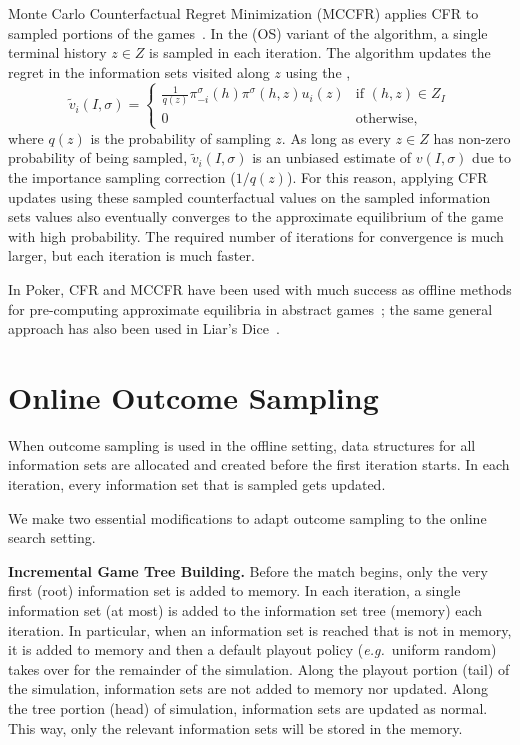 \documentclass{aamas2015}
\newcommand{\defword}[1]{\textbf{\boldmath{#1}}}
\newcommand{\eg}{{\it e.g.}~}
\begin{document}
Monte Carlo Counterfactual Regret Minimization (MCCFR) applies CFR to sampled portions of the games~\cite{Lanctot09Sampling}. 
In the \defword{outcome sampling} (OS) variant of the algorithm, a single terminal history $z\in Z$ is sampled in each iteration. 
The algorithm updates the regret in the information sets visited along $z$ using the 
\defword{sampled counterfactual value}, 
\begin{equation*}
\tilde{v}_i(I,\sigma) = \left\{
\begin{array}{ll}
\frac{1}{q(z)} \pi^{\sigma}_{-i}(h) \pi^{\sigma}(h,z) u_i(z) & \mbox{if } (h,z) \in Z_I\\
0  & \mbox{otherwise,}
\end{array} \right.
\end{equation*}
where $q(z)$ is the probability of sampling $z$. 
As long as every $z \in Z$ has non-zero probability of being sampled, $\tilde{v}_i(I,\sigma)$ is an unbiased estimate of $v(I,\sigma)$ 
due to the importance sampling correction ($1/q(z)$). For this reason, applying CFR updates using these sampled counterfactual values 
on the sampled information sets values also eventually converges to the approximate equilibrium of the game with high probability. 
The required number of iterations for convergence is much larger, but each iteration is much faster.

In Poker, CFR and MCCFR have been used with much success as offline methods 
for pre-computing approximate equilibria in abstract games~\cite{CFR,Johanson12CFRBR}; the same general 
approach has also been used in Liar's Dice~\cite{Neller11,Lanctot12IR}. 

\section{Online Outcome Sampling}

When outcome sampling is used in the offline setting, data structures for all information sets are allocated and created 
before the first iteration starts. In each iteration, every information set that is sampled gets updated. 

We make two essential modifications to adapt outcome sampling to the online search setting.

{\bf Incremental Game Tree Building.} Before the match begins, only the very first (root) information set is added to memory. 
In each iteration, a single information set (at most) is added to the information set tree (memory) each iteration.
In particular, when an information set is reached that is not in memory, it is added to memory and then a default 
playout policy (\eg uniform random) takes over for the remainder of the simulation.
Along the playout portion (tail) of the simulation, information sets are not added to memory nor updated.
Along the tree portion (head) of simulation, information sets are updated as normal. 
This way, only the relevant information sets will be stored in the memory.
\end{document}
